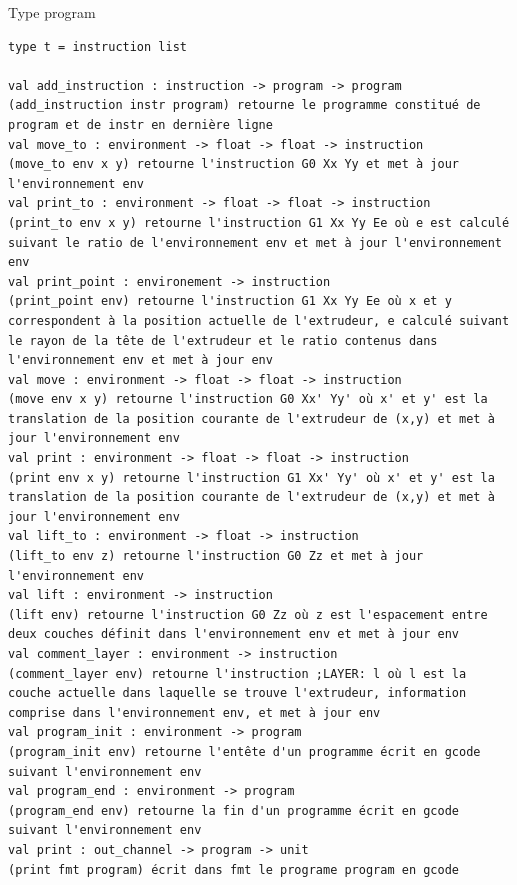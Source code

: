 \documentclass[11pt, titlepage]{article}
\begin{document}
Type program
\begin{lstlisting}
type t = instruction list

val add_instruction : instruction -> program -> program
(add_instruction instr program) retourne le programme constitué de program et de instr en dernière ligne
val move_to : environment -> float -> float -> instruction
(move_to env x y) retourne l'instruction G0 Xx Yy et met à jour l'environnement env
val print_to : environment -> float -> float -> instruction  
(print_to env x y) retourne l'instruction G1 Xx Yy Ee où e est calculé suivant le ratio de l'environnement env et met à jour l'environnement env 
val print_point : environement -> instruction
(print_point env) retourne l'instruction G1 Xx Yy Ee où x et y correspondent à la position actuelle de l'extrudeur, e calculé suivant le rayon de la tête de l'extrudeur et le ratio contenus dans l'environnement env et met à jour env
val move : environment -> float -> float -> instruction
(move env x y) retourne l'instruction G0 Xx' Yy' où x' et y' est la translation de la position courante de l'extrudeur de (x,y) et met à jour l'environnement env
val print : environment -> float -> float -> instruction
(print env x y) retourne l'instruction G1 Xx' Yy' où x' et y' est la translation de la position courante de l'extrudeur de (x,y) et met à jour l'environnement env
val lift_to : environment -> float -> instruction
(lift_to env z) retourne l'instruction G0 Zz et met à jour l'environnement env
val lift : environment -> instruction
(lift env) retourne l'instruction G0 Zz où z est l'espacement entre deux couches définit dans l'environnement env et met à jour env
val comment_layer : environment -> instruction
(comment_layer env) retourne l'instruction ;LAYER: l où l est la couche actuelle dans laquelle se trouve l'extrudeur, information comprise dans l'environnement env, et met à jour env
val program_init : environment -> program
(program_init env) retourne l'entête d'un programme écrit en gcode suivant l'environnement env
val program_end : environment -> program
(program_end env) retourne la fin d'un programme écrit en gcode suivant l'environnement env
val print : out_channel -> program -> unit
(print fmt program) écrit dans fmt le programe program en gcode
\end{lstlisting}
\end{document}
